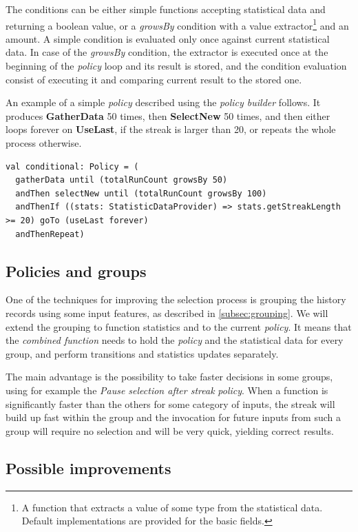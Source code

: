 The conditions can be either simple functions accepting statistical data and returning a boolean value, or a \textit{growsBy} condition with a value extractor\footnote{A function that extracts a value of some type from the statistical data. Default implementations are provided for the basic fields.} and an amount. A simple condition is evaluated only once against current statistical data. In case of the \textit{growsBy} condition, the extractor is executed once at the beginning of the \textit{policy} loop and its result is stored, and the condition evaluation consist of executing it and comparing current result to the stored one.

An example of a simple \textit{policy} described using the \textit{policy builder} follows. It produces \textbf{GatherData} 50 times, then \textbf{SelectNew} 50 times, and then either loops forever on \textbf{UseLast}, if the streak is larger than 20, or repeats the whole process otherwise.

\lstset{style=Scala}
\begin{lstlisting}
val conditional: Policy = (
  gatherData until (totalRunCount growsBy 50)
  andThen selectNew until (totalRunCount growsBy 100)
  andThenIf ((stats: StatisticDataProvider) => stats.getStreakLength >= 20) goTo (useLast forever)
  andThenRepeat)
\end{lstlisting}

\subsection{Policies and groups}

One of the techniques for improving the selection process is grouping the history records using some input features, as described in \ref{subsec:grouping}. We will extend the grouping to function statistics and to the current \textit{policy}. It means that the \textit{combined function} needs to hold the \textit{policy} and the statistical data for every group, and perform transitions and statistics updates separately.

The main advantage is the possibility to take faster decisions in some groups, using for example the \textit{Pause selection after streak} \textit{policy}. When a function is significantly faster than the others for some category of inputs, the streak will build up fast within the group and the invocation for future inputs from such a group will require no selection and will be very quick, yielding correct results.

\subsection{Possible improvements}
\label{subsec:policy_improvements}

